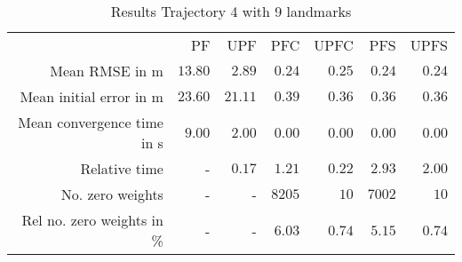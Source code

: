 \begin{table}
\centering
\begin{tabular}{rrrrrrr}
 & PF & UPF & PFC & UPFC & PFS & UPFS \\
Mean RMSE in m & $13.80$ & $2.89$ & $0.24$ & $0.25$ & $0.24$ & $0.24$ \\
Mean initial error in m & $23.60$ & $21.11$ & $0.39$ & $0.36$ & $0.36$ & $0.36$ \\
Mean convergence time in s & $9.00$ & $2.00$ & $0.00$ & $0.00$ & $0.00$ & $0.00$ \\
Relative time & - & $0.17$ & $1.21$ & $0.22$ & $2.93$ & $2.00$ \\
No. zero weights & - & - & $8205$ & $10$ & $7002$ & $10$ \\
Rel no. zero weights in \% & - & - & $6.03$ & $0.74$ & $5.15$ & $0.74$ \\
\end{tabular}
\caption{Results Trajectory 4 with 9 landmarks}
\label{table:landmark_positions_4}
\end{table}
